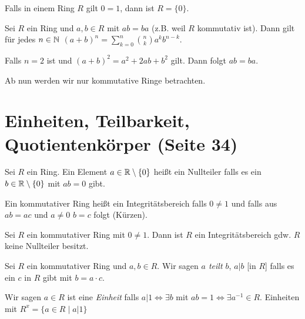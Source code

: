 \begin{lemma}
	Falls in einem Ring $R$ gilt $0=1$, dann ist  $R = \{0\}$.
\end{lemma}


\begin{lemma}[Binomialformel]
	Sei $R$ ein Ring und $a,b \in R$ mit $ab = ba$ (z.B. weil $R$ kommutativ ist).
	Dann gilt für jedes $n \in \mathbb{N}$ $(a+b)^{n} = \sum_{k=0}^{n} \binom{n}{k} a^{k} b^{n-k}$.
\end{lemma}


Falls $n = 2$ ist und $(a+b)^2 = a^2 + 2ab + b^2$ gilt. Dann folgt $ab = ba$.

\begin{attention}
Ab nun werden wir nur kommutative Ringe betrachten.
\end{attention}

\section{Einheiten, Teilbarkeit, Quotientenkörper (Seite 34)}

\begin{definition}
	Sei $R$ ein Ring. Ein Element $a \in \mathbb{R} \setminus \{0\}$ heißt ein Nullteiler falls es ein $b \in \mathbb{R} \setminus \{0\} $ mit $ab = 0$ gibt.
\end{definition}

\begin{definition}
	Ein kommutativer Ring heißt ein Integritätsbereich falls $0 \neq 1$ und falls aus $ab = ac$ und $a\neq 0$ $b = c$ folgt (Kürzen).
\end{definition}

\begin{lemma}
	Sei $R$ ein kommutativer Ring mit $0 \neq 1$. Dann ist $R$ ein Integritätsbereich gdw. $R$ keine Nullteiler besitzt.
\end{lemma}



\begin{definition}
	Sei $R$ ein kommutativer Ring und  $a,b \in R$.
	Wir sagen \emph{$a$ teilt  $b$}, $a \vert b$ [in $R$] falls es ein $c$ in $R$ gibt mit $b = a \cdot c$.
\end{definition}

\begin{definition}
	Wir sagen $a \in R$ ist eine \emph{Einheit} falls $a \vert 1 \Leftrightarrow \exists b	$ mit $ab = 1 \Leftrightarrow \exists a^{-1} \in R$.
	Einheiten mit $R^{x} = \{a \in R \mid a \vert 1\} $
\end{definition}


